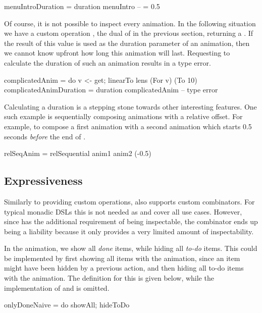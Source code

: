 \begin{spec}
menuIntroDuration = duration menuIntro -- = 0.5
\end{spec}

Of course, it is not possible to inspect every animation. In the following situation we have a custom operation , the dual of  in the previous section, returning a . If the result of this value is used as the duration parameter of an animation, then we cannot know upfront how long this animation will last. Requesting to calculate the duration of such an animation results in a type error.

\begin{spec}
complicatedAnim = do v <- get; linearTo lens (For v) (To 10)
complicatedAnimDuration = duration complicatedAnim -- type error
\end{spec}

Calculating a duration is a stepping stone towards other interesting features. One such example is sequentially composing animations with a relative offset. For example, to compose a first animation  with a second animation  which starts 0.5 seconds \emph{before} the end of .

\begin{spec}
relSeqAnim = relSequential anim1 anim2 (-0.5)
\end{spec}

\subsection{Expressiveness}
\label{sec:customcomb}

Similarly to providing custom operations, \dsl{} also supports custom
combinators. For typical monadic DSLs this is not needed as \hs{>>=} and  
cover all use cases.
However, since \dsl{} has the additional requirement of being inspectable, the
\hs{>>=} combinator ends up being a liability because it only provides a very
limited amount of inspectability.

In the  animation, we show all \emph{done} items, while
hiding all \emph{to-do} items. This could be implemented by first
showing all items with the  animation, since an item might have
been hidden by a previous action, and then hiding all to-do items with the
 animation. The definition for this is given below, while the
implementation of  and  is omitted.

\begin{spec}
onlyDoneNaive = do showAll; hideToDo
\end{spec}

